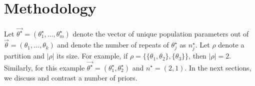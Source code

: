 \documentclass[11pt,a4paper]{article}
\theoremstyle{definition} %
\theoremstyle{case}
\newcommand{\FD}[1]{\textcolor{red}{Fabian: #1 }}
\begin{document}




\section{Methodology} \label{sec:methodology}
Let $\vec{\theta^{\star}} = (\theta^{\star}_1, \ldots, \theta^{\star}_m)$ denote the vector of unique population parameters out of $\vec{\theta} = (\theta_1, \ldots, \theta_k)$ and denote the number of repeats of $\theta^{\star}_j$ as $n^{\star}_j$. Let $\rho$ denote a partition and $|\rho|$ its size. For example, if $\rho = \{\{\theta_1, \theta_2\}, \{\theta_3\}\}$, then $|\rho| = 2$. Similarly, for this example $\vec{\theta^{\star}} = (\theta^{\star}_1, \theta^{\star}_2)$ and $n^{\star} = (2, 1)$. In the next sections, we discuss and contrast a number of priors.
\end{document}
